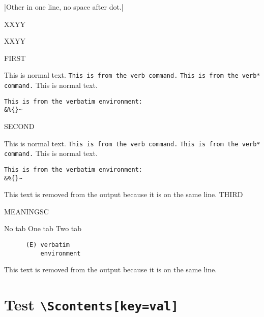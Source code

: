 \documentclass{article}
\begin{document}

\Scontents*[store-cmd=nospace]|Other in one line, no space after dot.|

XXYY\par
XXYY\par

\par
{}\par

\par
{}

FIRST\par
This is normal text.
\verb|This is from the verb command.|
\verb*|This is from the verb* command.|
This is normal text.
\begin{verbatim}
This is from the verbatim environment:
&%{}~
\end{verbatim}

SECOND\par
\begin{scontents}[store-env=newattempt,print-env=true]
This is normal text.
\verb|This is from the verb command.|
\verb*|This is from the verb* command.|
This is normal text.
\begin{verbatim}
This is from the verbatim environment:
&%{}~
\end{verbatim}
\end{scontents}This text is removed from the output because it is on the same line.
THIRD\par
\par

MEANINGSC\par
{}\par
\begin{scontents}[write-out=withtab.tsc]
No tab
	One tab
		Two tab
\begin{verbatim}
      (E) verbatim
          environment
\end{verbatim}
\end{scontents}This text is removed from the output because it is on the same line.


\section{Test \texttt{\textbackslash Scontents[key=val]}}
\end{document}
